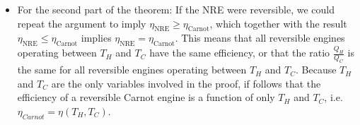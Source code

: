 \documentclass[11pt, a4paper]{article}
\begin{document}
\begin{itemize}
\begin{itemize}
		\item For the second part of the theorem: If the NRE were reversible, we could repeat the argument to imply $ \eta_{\text{NRE}} \geq \eta_{\text{Carnot}} $, which together with the result $ \eta_{\text{NRE}} \leq \eta_{\text{Carnot}}  $ implies $ \eta_{\text{NRE}} = \eta_{\text{Carnot}}  $. This means that all reversible engines operating between $ T_{H} $ and $ T_{C} $ have the same efficiency, or that the ratio $ \frac{Q_{H}}{Q_{C}} $ is the same for all reversible engines  operating between $ T_{H} $ and $ T_{C} $. Because $ T_{H} $ and $ T_{C} $ are the only variables involved in the proof, if follows that the efficiency of a reversible Carnot engine is a function of only $ T_{H} $ and $ T_{C} $, i.e. $ \eta_{Carnot} = \eta(T_{H}, T_{C}) $.
		
	\end{itemize}
	

\end{itemize}
\end{document}
